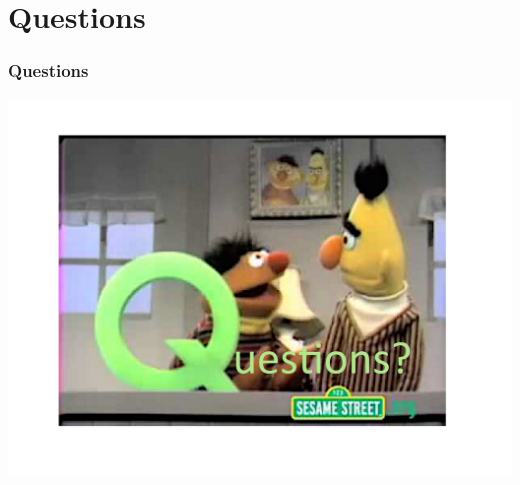 \documentclass{beamer}
\begin{document}
\section{Questions}
\begin{frame}
\frametitle{Questions}
\begin{center}
\begin{center} 
\includegraphics[width=.7 \textwidth]{quests}
\end{center}
\end{center}



\end{frame}

 
\end{document}
